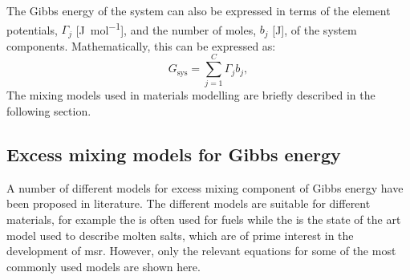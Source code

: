 The Gibbs energy of  the system can also be expressed in terms of the element potentials, $\Gamma_j$ [\si{\joule \per \mole}], and the number of moles, $b_j$ [\si{\joule}], of the system components. Mathematically, this can be expressed as:
\begin{equation}\label{eq:elempot}
            G_\text{sys} = \sum_{j=1}^{C} \Gamma_j b_j,
    \end{equation}
The mixing models used in materials modelling are briefly described in the following section.

	\subsection{Excess mixing models for Gibbs energy}\label{sec:excess_models}
	A number of different models for excess mixing component of Gibbs energy have been proposed in literature. The different models are suitable for different materials, for example the  is often used for  fuels while the  is the state of the art model used to describe molten salts, which are of prime interest in the development of \gls{msr}. However, only the relevant equations for some of the most commonly used models are shown here.
